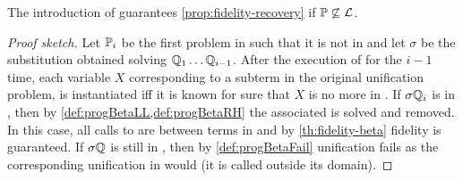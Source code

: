 \begin{theorem}[Fidelity in \Fo]
  The introduction of \linkbeta guarantees \cref{prop:fidelity-recovery}
  if $\mathbb{P} \not\subseteq \mathcal{L}$.
\end{theorem}

\begin{proof}[Proof sketch]
  Let $\mathbb{P}_i$ be the first problem in \foUnifPb{} such that it is not in \llambda and let
  $\sigma$ be the substitution obtained solving
  $\mathbb{Q}_1\ldots\mathbb{Q}_{i-1}$. After the execution of \hstep
  for the $i-1$ time,
  each variable $X$ corresponding to a \maybeeta subterm in the original \Fo 
  unification problem, is instantiated iff it is known for sure
  that $X$ is no more in \maybeeta. If $\sigma\mathbb{Q}_i$ is in \llambda, then 
  by \cref{def:progBetaLL,def:progBetaRH} the associated \linkbeta
  is solved and removed. In this case, all
  calls to \Ue{} are between terms in \llambda and by \cref{th:fidelity-beta}
  fidelity is guaranteed. If $\sigma\mathbb{Q}$ is still in \notllambda,
  then by \cref{def:progBetaFail} unification fails as the
  corresponding unification in \Fo{} would (it is called outside its domain).
\end{proof}

